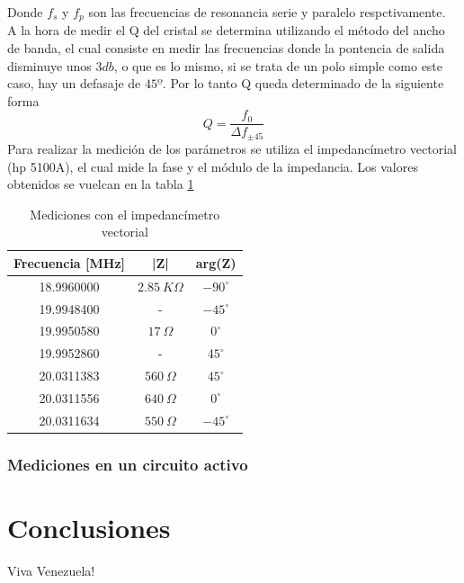 \documentclass[a4paper,10pt]{article}
\begin{document}
		\indent Donde $f_s$ y $f_p$ son las frecuencias de resonancia serie y 
		paralelo respctivamente. \\
		\indent A la hora de medir el Q del cristal se determina utilizando el 
		método del ancho de banda, el cual consiste en medir las frecuencias 
		donde la pontencia de salida disminuye unos $3db$, o que es lo mismo, 
		si se trata de un polo simple como este caso, hay un defasaje de $45º$.
		Por lo tanto Q queda determinado de la siguiente forma
		$$Q = \frac{f_0}{\Delta f_{\pm45}}$$
		\indent Para realizar la medición de los parámetros se utiliza el 
		impedancímetro vectorial (hp 5100A), el cual mide la fase y el módulo de
		la impedancia. Los valores obtenidos se vuelcan en la tabla \ref{tab003}

		\begin{table}[!htp]
			\centering
			\begin{tabular}{|c|c|c|}
				\hline
				Frecuencia [MHz] & |Z| & arg(Z) \\
				\hline
				18.9960000 & $2.85~K\Omega$ & $-90^{\circ}$ \\
				\hline
				19.9948400 & - & $-45^{\circ}$ \\ 
				\hline
				19.9950580 & $17~\Omega$ & $0^{\circ}$ \\
				\hline
				19.9952860 & - & $45^{\circ}$ \\ 
				\hline									
				20.0311383 & $560~\Omega$ & $45^{\circ}$ \\
				\hline									
				20.0311556 & $640~\Omega$ & $0^{\circ}$ \\
				\hline									
				20.0311634 & $550~\Omega$ & $-45^{\circ}$ \\
				\hline									
			\end{tabular}
			\caption{Mediciones con el impedancímetro vectorial} \label{tab003}
		\end{table}	

		\subsubsection{Mediciones en un circuito activo}
			
	\section{Conclusiones}
	\indent Viva Venezuela!\\
\end{document}
